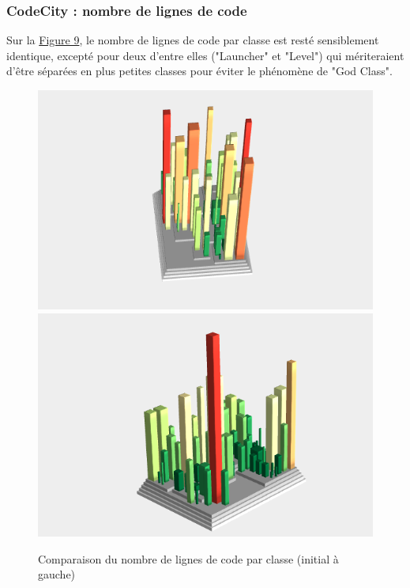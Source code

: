 \documentclass[a4paper,12pt]{report} %
\begin{document}
\subsubsection{CodeCity : nombre de lignes de code}

Sur la \hyperref[figure9]{Figure 9}, le nombre de lignes de code par
classe est resté sensiblement identique, excepté pour deux d'entre elles
("Launcher" et "Level") qui mériteraient d'être séparées en plus petites
classes pour éviter le phénomène de "God Class".

\begin{figure}[!h]
\includegraphics[scale=0.5]{ressources/final_initial_lines_of_code}\includegraphics[scale=0.5]{ressources/final_new_lines_of_code}\caption{Comparaison du nombre de lignes de code par classe (initial à gauche)}\label{figure9}


\end{figure}
\end{document}
